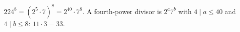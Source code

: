 $224^8=(2^5\cdot7)^8=2^{40}\cdot7^8$. A fourth-power divisor is $2^a7^b$ with $4\mid a\le40$ and $4\mid b\le8$: $11\cdot3=\boxed{33}$.
